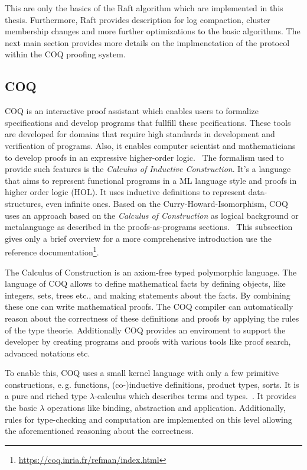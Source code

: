 \vspace{2em}

This are only the basics of the Raft algorithm which are implemented
in this thesis. Furthermore, Raft provides description for log compaction,
cluster membership changes and more further optimizations to the basic
algorithms. The next main section provides more details on the
implmenetation of the protocol within the COQ proofing system.

\subsection{COQ}
COQ is an interactive proof assistant which enables users to formalize
specifications and develop programs that fullfill these pecifications.
These tools are developed for domains that require high standards in
development and verification of programs. Also, it enables computer
scientist and mathematicians to develop proofs in an expressive
higher-order logic.~\cite{the_coq_development_team_2019_2554024}
The formalism used to provide such features is the \textit{Calculus of Inductive
  Construction}. It's a language that aims to represent functional programs
in a ML language style and proofs in higher order logic (HOL).
It uses inductive definitions to represent data-structures, even infinite
ones. Based on the Curry-Howard-Isomorphism, COQ uses an approach based
on the \textit{Calculus of Construction} as logical
background or metalanguage as described in the proofs-as-programs
sections.~\cite{the_coq_development_team_2019_2554024,
  paulinmohring:hal-01094195} This subsection gives only a brief overview
for a more comprehensive introduction use the reference documentation\footnote{\url{https://coq.inria.fr/refman/index.html}}.

The Calculus of Construction is an axiom-free typed polymorphic language.
The language of COQ allows to define mathematical facts by
defining objects, like integers, sets, trees etc., and making statements
about the facts. By combining these one can write mathematical proofs.
The COQ compiler can automatically reason about the correctness of these
definitions and proofs by applying the rules of the type theorie.
Additionally COQ provides an enviroment to support the developer by
creating programs and proofs with various tools like proof search, advanced
notations etc.~\cite{paulin2011introduction}

To enable this, COQ uses a small kernel language with only a few
primitive constructions, e.\,g. functions, (co-)inductive definitions,
product types, sorts. It is a pure and riched type $\lambda$-calculus which
describes terms and types.~\cite{paulinmohring:hal-01094195}.
It provides the basic $\lambda$ operations like binding, abstraction
and application. Additionally, rules for type-checking and computation
are implemented on this level allowing the aforementioned reasoning
about the correctness.~\cite{paulin2011introduction, paulinmohring:hal-01094195}

